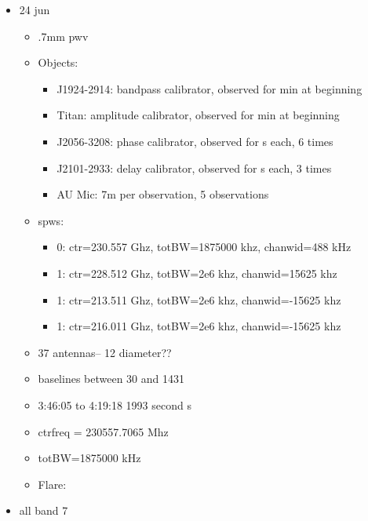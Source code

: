 \documentclass[a4paper]{tufte-handout}
\begin{document}
\begin{itemize}
	\item 24 jun
	      \begin{itemize}
	      	\item \abt .7mm pwv
	      	\item Objects:
	      	      \begin{itemize}
	      	      	\item J1924-2914: bandpass calibrator, observed for  min at beginning
	      	      	\item Titan: amplitude calibrator, observed for  min at beginning
	      	      	\item J2056-3208: phase calibrator, observed for  s each, 6 times
	      	      	\item J2101-2933: delay calibrator, observed for  s each, 3 times
	      	      	\item AU Mic: \abt 7m per observation, 5 observations
	      	      \end{itemize}
	      	\item spws:
	      	      \begin{itemize}
	      	      	\item 0: ctr=230.557 Ghz, totBW=1875000 khz, chanwid=488 kHz
	      	      	\item 1: ctr=228.512 Ghz, totBW=2e6 khz, chanwid=15625 khz
	      	      	\item 1: ctr=213.511 Ghz, totBW=2e6 khz, chanwid=-15625 khz
	      	      	\item 1: ctr=216.011 Ghz, totBW=2e6 khz, chanwid=-15625 khz
	      	      \end{itemize}
	      	\item 37 antennas-- 12 diameter??
	      	\item baselines between 30 and 1431
	      	\item 3:46:05 to 4:19:18 1993 second  s
	      	\item ctrfreq = 230557.7065 Mhz
	      	\item totBW=1875000 kHz
	      	\item Flare:
	      \end{itemize}

	\item all band 7

\end{itemize}

\hrulefill

\end{document}
